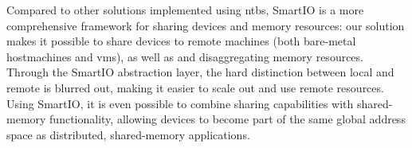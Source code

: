 Compared to other solutions implemented using \glspl{ntb}, SmartIO is a more comprehensive framework for sharing devices and memory resources:
%
our solution makes it possible to share devices to remote machines (both bare-metal \glspl{hostmachine} and \glspl{vm}), as well as and \gls{disaggregating} memory resources. 
%
Through the SmartIO abstraction layer, the hard distinction between local and remote is blurred out, making it easier to scale out and use remote resources.
%
Using SmartIO, it is even possible to combine sharing capabilities with shared-memory functionality, allowing devices to become part of the same global address space as distributed, shared-memory applications.
